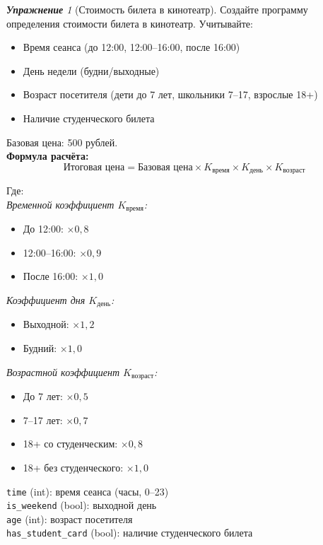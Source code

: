 \documentclass[a4paper,12pt]{article}
\theoremstyle{remark}
\newtheorem{exercise}{\textbf{Упражнение}}[section]
\begin{document}
\setcounter{exercise}{35}
\begin{exercise}[Стоимость билета в кинотеатр]
Создайте программу определения стоимости билета в кинотеатр. Учитывайте:
\begin{itemize}
    \item Время сеанса (до 12:00, 12:00--16:00, после 16:00)
    \item День недели (будни/выходные)
    \item Возраст посетителя (дети до 7 лет, школьники 7--17, взрослые 18+)
    \item Наличие студенческого билета
\end{itemize}
Базовая цена: 500 рублей. \\
\textbf{Формула расчёта:}
$$\text{Итоговая цена} = \text{Базовая цена} \times K_{\text{время}} \times K_{\text{день}} \times K_{\text{возраст}}$$

\noindent Где: \\[4pt]
\textit{Временной коэффициент $K_{\text{время}}$:}
\begin{itemize}
    \item До 12:00: $\times 0{,}8$
    \item 12:00--16:00: $\times 0{,}9$
    \item После 16:00: $\times 1{,}0$
\end{itemize}

\textit{Коэффициент дня $K_{\text{день}}$:}
\begin{itemize}
    \item Выходной: $\times 1{,}2$
    \item Будний: $\times 1{,}0$
\end{itemize}

\textit{Возрастной коэффициент $K_{\text{возраст}}$:}
\begin{itemize}
    \item До 7 лет: $\times 0{,}5$
    \item 7--17 лет: $\times 0{,}7$
    \item 18+ со студенческим: $\times 0{,}8$
    \item 18+ без студенческого: $\times 1{,}0$
\end{itemize}

\begin{inputformat}[title=Входные данные]
    \texttt{time} (int): время сеанса (часы, 0--23) \\
    \texttt{is\_weekend} (bool): выходной день \\
    \texttt{age} (int): возраст посетителя \\
    \texttt{has\_student\_card} (bool): наличие студенческого билета
\end{inputformat}


\end{exercise}
\end{document}
